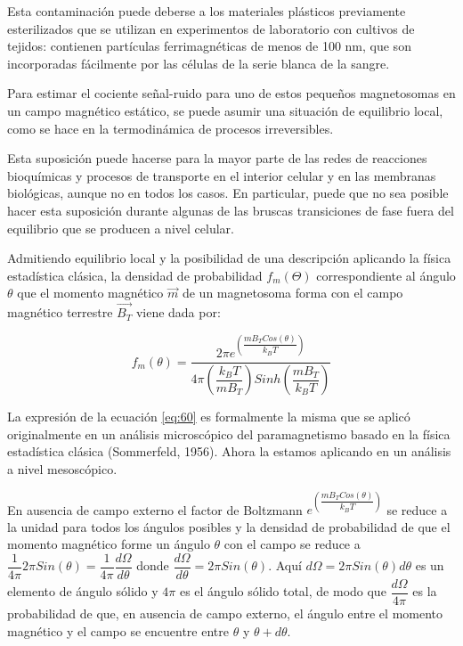 Esta contaminación puede deberse a los materiales plásticos previamente esterilizados que se utilizan en experimentos de laboratorio con cultivos de tejidos: contienen partículas ferrimagnéticas de menos de 100 nm, que son incorporadas fácilmente por las células de la serie blanca de la sangre.

Para estimar el cociente señal-ruido para uno de estos pequeños magnetosomas en un campo magnético estático, se puede asumir una situación de equilibrio local, como se hace en la termodinámica de procesos irreversibles.

Esta suposición puede hacerse para la mayor parte de las redes de reacciones bioquímicas y procesos de transporte en el interior celular y en las membranas biológicas, aunque no en todos los casos. En particular, puede que no sea posible hacer esta suposición durante algunas de las bruscas transiciones de fase fuera del equilibrio que se producen a nivel celular.

Admitiendo equilibrio local y la posibilidad de una descripción aplicando la física estadística clásica, la densidad de probabilidad $f_{m}(\Theta)$ correspondiente al ángulo $\theta$ que el momento magnético $\overrightarrow{m}$ de un magnetosoma forma con el campo magnético terrestre $\overrightarrow{B_{T}}$ viene dada por:

\begin{equation}
	\label{eq:60}
	f_{m}(\theta)=\dfrac { 2\pi e^{\left( \dfrac{m B_{T} Cos(\theta)}{k_{B}T}\right) }}{4\pi \left( \dfrac{k_{B}T}{m B_{T}} \right) Sinh\left( \dfrac{ m B_{T}}{k_{B}T} \right)}    
\end{equation}

La expresión de la ecuación \ref{eq:60} es formalmente la misma que se aplicó originalmente en un análisis microscópico del paramagnetismo basado en la física estadística clásica (Sommerfeld, 1956). Ahora la estamos aplicando en un análisis a nivel mesoscópico.

En ausencia de campo externo el factor de Boltzmann ${e^{\left( \dfrac{m B_{T} Cos(\theta)}{k_{B}T}\right)}}$ se reduce a la unidad para todos los ángulos posibles y la densidad de probabilidad de que el momento magnético forme un ángulo $\theta$ con el campo se reduce a $\dfrac{1}{4\pi} 2 \pi Sin(\theta) = \dfrac{1}{4\pi}\dfrac{d\Omega}{d\theta}$ donde ${\dfrac{d\Omega}{d\theta} = 2\pi Sin(\theta)}$. Aquí $d\Omega=2\pi Sin(\theta) d\theta$ es un elemento de ángulo sólido y $4\pi$ es el ángulo sólido total, de modo que $\dfrac{d\Omega}{4\pi}$ es la probabilidad de que, en ausencia de campo externo, el ángulo entre el momento magnético y el campo se encuentre entre $\theta$ y $\theta + d\theta$.


